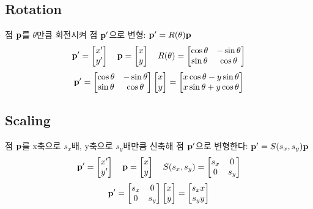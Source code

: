 \subsection{Rotation}

점 $\bold{p}$를 $\theta$만큼 회전시켜 점 $\bold{p}^\prime$으로 변형: $\bold{p}^\prime = R(\theta)\bold{p}$
$$
\bold{p}^\prime =
\begin{bmatrix}
  x^\prime \\
  y^\prime
\end{bmatrix}
\quad
\bold{p} =
\begin{bmatrix}
  x \\
  y
\end{bmatrix}
\quad
R(\theta) =
\begin{bmatrix}
  \cos{\theta} & -\sin{\theta} \\
  \sin{\theta} & \cos{\theta}
\end{bmatrix}
$$
$$
\bold{p}^\prime =
\begin{bmatrix}
  \cos{\theta} & -\sin{\theta} \\
  \sin{\theta} & \cos{\theta}
\end{bmatrix}
\begin{bmatrix}
  x \\
  y
\end{bmatrix}
=
\begin{bmatrix}
  x\cos{\theta} - y\sin{\theta} \\
  x\sin{\theta} + y\cos{\theta}
\end{bmatrix}
$$

\subsection{Scaling}

점 $\bold{p}$를 x축으로 $s_x$배, y축으로 $s_y$배만큼 신축해 점 $\bold{p}^\prime$으로 변형한다: $\bold{p}^\prime = S(s_x, s_y)\bold{p}$
$$
\bold{p}^\prime =
\begin{bmatrix}
  x^\prime \\
  y^\prime
\end{bmatrix}
\quad
\bold{p} =
\begin{bmatrix}
  x \\
  y
\end{bmatrix}
\quad
S(s_x, s_y) =
\begin{bmatrix}
  s_x & 0 \\
  0 & s_y
\end{bmatrix}
$$
$$
\bold{p}^\prime =
\begin{bmatrix}
  s_x & 0 \\
  0 & s_y
\end{bmatrix}
\begin{bmatrix}
  x \\
  y
\end{bmatrix}
=
\begin{bmatrix}
  s_x x \\
  s_y y
\end{bmatrix}
$$

